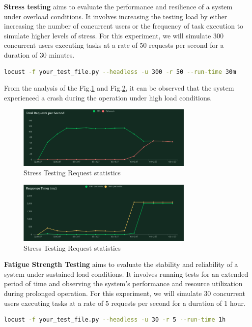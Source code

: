 \documentclass[journal]{IEEEtran}
\begin{document}
\textbf{Stress testing} aims to evaluate the performance and resilience of a system under overload conditions. It involves increasing the testing load by either increasing the number of concurrent users or the frequency of task execution to simulate higher levels of stress. For this experiment, we will simulate 300 concurrent users executing tasks at a rate of 50 requests per second for a duration of 30 minutes.
\begin{lstlisting}[label={lst:locustcmd3},language=BASH,breaklines=true]
locust -f your_test_file.py --headless -u 300 -r 50 --run-time 30m 
\end{lstlisting}

From the analysis of the Fig.\ref{fig:stressreqstat} and Fig.\ref{fig:stressrespstat}, it can be observed that the system experienced a crash during the operation under high load conditions.

\begin{figure}[h]
  \centering
  \includegraphics[width=3.4in]{figures/stressreqstat.png}
  \caption{Stress Testing Request statistics}
  \label{fig:stressreqstat}
  \end{figure}

\begin{figure}[h]
  \centering
  \includegraphics[width=3.4in]{figures/stressrespstat.png}
  \caption{Stress Testing Request statistics}
  \label{fig:stressrespstat}
  \end{figure}

\textbf{Fatigue Strength Testing} aims to evaluate the stability and reliability of a system under sustained load conditions. It involves running tests for an extended period of time and observing the system's performance and resource utilization during prolonged operation. For this experiment, we will simulate 30 concurrent users executing tasks at a rate of 5 requests per second for a duration of 1 hour. 
\begin{lstlisting}[label={lst:locustcmd4},language=BASH,breaklines=true]
locust -f your_test_file.py --headless -u 30 -r 5 --run-time 1h 
\end{lstlisting}
\end{document}
